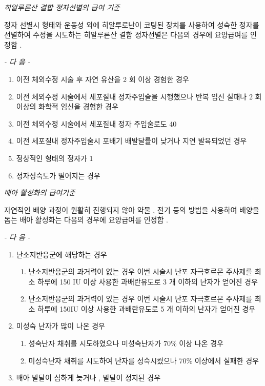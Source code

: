 \emph{히알루론산 결합  정자선별의 급여 기준 }\par
정자 선별시 형태와 운동성 외에 히알루로난이 코팅된 장치를  사용하여 성숙한 정자를 선별하여 수정을 시도하는 히알루론산  결합 정자선별은 다음의 경우에 요양급여를 인정함 . \par

\emph{-  다 음  -}\par  
\begin{enumerate}[가.]\tightlist
\item 이전 체외수정 시술 후 자연 유산을  2 회 이상 경험한 경우 
\item 이전 체외수정 시술에서 세포질내 정자주입술을 시행했으나  반복 임신 실패나  2 회 이상의 화학적 임신을 경험한 경우  
\item 이전 체외수정 시술에서 세포질내 정자 주입술로도  40%
\item 이전  세포질내 정자주입술시  포배기 배발달률이 낮거나 지연 발육되었던 경우 
\item 정상적인 형태의 정자가  1%
\item 정자성숙도가 떨어지는 경우 
\end{enumerate} 

\par
\emph{배아 활성화의 급여기준}\par
자연적인 배양 과정이 원활히 진행되지 않아 약물 ,  전기 등의  방법을 사용하여 배양을 돕는 배아 활성화는  다음의 경우에 요양급여를 인정함 . \par
\emph{-  다 음  -}\par  
\begin{enumerate}[가.]\tightlist
\item 난소저반응군에 해당하는 경우 
	\begin{enumerate}[1)]\tightlist
	\item 난소저반응군의 과거력이 없는 경우 이번 시술시 난포 자극호르몬 주사제를 최소 하루에  150 IU  이상 사용한  과배란유도로  3 개 이하의 난자가 얻어진 경우 
	\item 난소저반응군의 과거력이 있는 경우 이번 시술시 난포 자극호르몬 주사제를 최소 하루에  150IU  이상 사용한 과배란유도로  5 개 이하의 난자가 얻어진 경우 
	\end{enumerate}
\item 미성숙 난자가 많이 나온 경우 
	\begin{enumerate}[1)]\tightlist
	\item 성숙난자 채취를 시도하였으나 미성숙난자가  70\%  이상 나온 경우 
	\item 미성숙난자 채취를 시도하여 난자를 성숙시켰으나  70\%  이상에서 실패한 경우 
	\end{enumerate}
\item 배아 발달이 심하게 늦거나 ,  발달이 정지된 경우 
\end{enumerate} 

